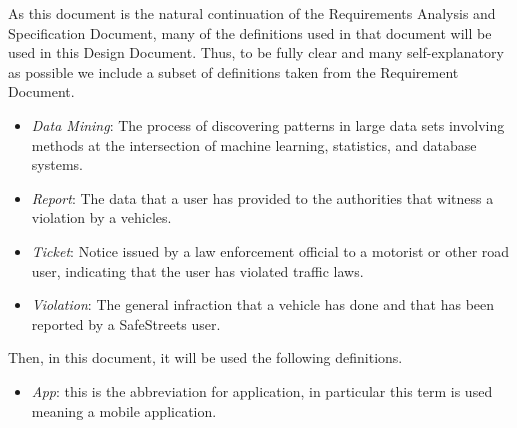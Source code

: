 As this document is the natural continuation of the Requirements Analysis and Specification Document, many of the definitions used in that document will be used in this Design Document.
Thus, to be fully clear and many self-explanatory as possible we include a subset of definitions taken from the Requirement Document.

\begin{itemize}
	\item \textit{Data Mining}: The process of discovering patterns in large data sets involving methods at the intersection of machine learning, statistics, and database systems.
	
	\item \textit{Report}: The data that a user has provided to the authorities that witness a violation by a vehicles.
	
	\item \textit{Ticket}: Notice issued by a law enforcement official to a motorist or other road user, indicating that the user has violated traffic laws.
	
	\item \textit{Violation}: The general infraction that a vehicle has done and that has been reported by a SafeStreets user.
	
	\begin{comment}
		\item \textit{Guest}: This actor plays the role of a person who is not registered and thus logged in.
	
		\item \textit{User}: This actor refers to the condition of a normal person (not an officer) already signed up.
		
		\item \textit{Officer} or \textit{Authority}: This actor represents a public officer that interacts with SafeStreets in some ways.
		
		\item \textit{Customer}: either a Guest or an Authority
	\end{comment}
\end{itemize}

\flushleft
Then, in this document, it will be used the following definitions.

\begin{itemize}
	\item \textit{App}: this is the abbreviation for application, in particular this term is used meaning a mobile application.
\end{itemize}